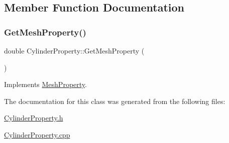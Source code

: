 \subsection{Member Function Documentation}
\mbox{\label{class_cylinder_property_a9e5b9bf44af9e9284004b1674c2f4837}} 
\subsubsection{\texorpdfstring{GetMeshProperty()}{GetMeshProperty()}}
{\footnotesize\ttfamily double Cylinder\+Property\+::\+Get\+Mesh\+Property (\begin{DoxyParamCaption}{ }\end{DoxyParamCaption})\hspace{0.3cm}{\ttfamily [virtual]}}



Implements \mbox{\hyperlink{class_mesh_property_a0a50701a5c33ce7aec5c413b409a754f}{Mesh\+Property}}.



The documentation for this class was generated from the following files\+:\begin{DoxyCompactItemize}
\item 
\mbox{\hyperlink{_cylinder_property_8h}{Cylinder\+Property.\+h}}\item 
\mbox{\hyperlink{_cylinder_property_8cpp}{Cylinder\+Property.\+cpp}}\end{DoxyCompactItemize}

